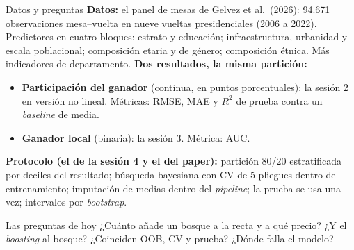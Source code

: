 \documentclass{beamer}
\newcommand{\1}{\mathbb{I}}
\begin{document}
\begin{frame}{Datos y preguntas}
\small
\textbf{Datos:} el panel de mesas de Gelvez et al.\ (2026): 94.671 observaciones mesa--vuelta en nueve vueltas presidenciales (2006 a 2022). Predictores en cuatro bloques: estrato y educación; infraestructura, urbanidad y escala poblacional; composición etaria y de género; composición étnica. Más indicadores de departamento.
\pause
\vspace{0.1cm}
\textbf{Dos resultados, la misma partición:}
\begin{itemize}\itemsep2pt
  \item \textbf{Participación del ganador} (continua, en puntos porcentuales): la sesión 2 en versión no lineal. Métricas: RMSE, MAE y $R^2$ de prueba contra un \emph{baseline} de media.
  \item \textbf{Ganador local} (binaria): la sesión 3. Métrica: AUC.
\end{itemize}
\pause
\vspace{0.1cm}
\textbf{Protocolo (el de la sesión 4 y el del paper):} partición 80/20 estratificada por deciles del resultado; búsqueda bayesiana con CV de 5 pliegues dentro del entrenamiento; imputación de medias dentro del \emph{pipeline}; la prueba se usa una vez; intervalos por \emph{bootstrap}.
\pause
\begin{block}{Las preguntas de hoy}
¿Cuánto añade un bosque a la recta y a qué precio? ¿Y el \emph{boosting} al bosque? ¿Coinciden OOB, CV y prueba? ¿Dónde falla el modelo?
\end{block}
\end{frame}
\end{document}
